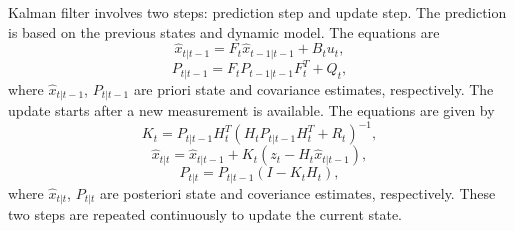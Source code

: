 \documentclass[11pt]{article}
\begin{document}
Kalman filter involves two steps: prediction step and update step. The prediction  is based on the previous states and dynamic model. The equations are
$$\hat{x}_{t|t-1} = F_t \hat{x}_{t-1|t-1} + B_t u_t,$$
$$P_{t|t-1} = F_t P_{t-1|t-1}F_t^T + Q_t,$$
where $\hat{x}_{t|t-1}$, $P_{t|t-1}$ are priori state and covariance estimates, respectively.
The update starts after a new measurement is available. The equations are given by
$$K_t = P_{t|t-1} H_t^T (H_t P_{t|t-1} H_t^T + R_t)^{-1},$$
$$\hat{x}_{t|t} = \hat{x}_{t|t-1} + K_t (z_t - H_t \hat{x}_{t|t-1}),$$
$$P_{t|t} = P_{t|t-1} (I - K_t H_t),$$
where $\hat{x}_{t|t}$, $P_{t|t}$ are posteriori state and coveriance estimates, respectively. These two steps are repeated continuously to update the current state.
\end{document}
